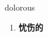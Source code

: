 
\begin{frame}
{\huge dolorous}
\begin{center}
\begin{enumerate}\Large
  \item \textbf{忧伤的}
\end{enumerate}
\end{center}
\end{frame}
